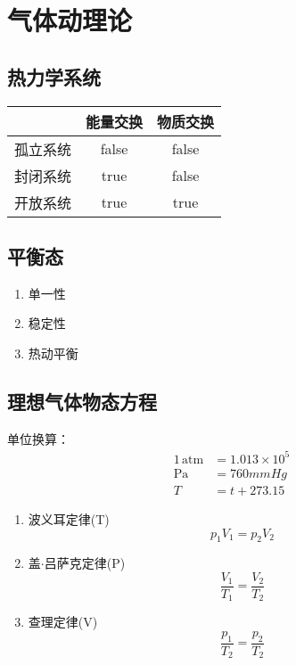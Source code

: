 \chapter{气体动理论}
\newpage

\section{热力学系统}

\begin{table}[!htbp]
    \centering
    \begin{tabular}{lcc}
        \toprule
                 & 能量交换 & 物质交换 \\
        \midrule
        孤立系统 & false    & false    \\
        封闭系统 & true     & false    \\
        开放系统 & true     & true     \\
        \bottomrule
    \end{tabular}
\end{table}

\section{平衡态}

\begin{enumerate}
    \item 单一性
    \item 稳定性
    \item 热动平衡
\end{enumerate}

\section{理想气体物态方程}

单位换算：
\begin{equation}
    \begin{aligned}
        1\,\mathrm{atm} & =1.013\times10^5 \\
        \mathrm{Pa}     & =760mmHg         \\
        T               & =t+273.15
    \end{aligned}
\end{equation}

\begin{enumerate}
    \item 波义耳定律(T)
          \begin{equation}
              p_1V_1=p_2V_2
          \end{equation}
    \item 盖$\cdot$吕萨克定律(P)
          \begin{equation}
              \frac{V_1}{T_1}=\frac{V_2}{T_2}
          \end{equation}
    \item 查理定律(V)
          \begin{equation}
              \frac{p_1}{T_2}=\frac{p_2}{T_2}
          \end{equation}
\end{enumerate}

